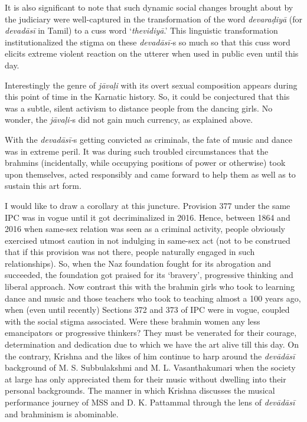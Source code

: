 {It is also significant to note that such dynamic social changes brought about by the judiciary were well-captured in the transformation of the word \textit{devaraḍiyā} (for \textit{devadāsī} in Tamil) to a cuss word ‘\textit{thevidiyā}.’ This linguistic transformation institutionalized the stigma on these \textit{devadāsī-}s so much so that this cuss word elicits extreme violent reaction on the utterer when used in public even until this day.

Interestingly the genre of \textit{jāvaḷi} with its overt sexual composition appears during this point of time in the Karnatic history. So, it could be conjectured that this was a subtle, silent activism to distance people from the dancing girls. No wonder, the \textit{jāvaḷi-}s did not gain much currency, as explained above.

With the \textit{devadāsī-}s getting convicted as criminals, the fate of music and dance was in extreme peril. It was during such troubled circumstances that the brahmins (incidentally, while occupying positions of power or otherwise) took upon themselves, acted responsibly and came forward to help them as well as to sustain this art form.

I would like to draw a corollary at this juncture. Provision 377 under the same IPC was in vogue until it got decriminalized in 2016. Hence, between 1864 and 2016 when same-sex relation was seen as a criminal activity, people obviously exercised utmost caution in not indulging in same-sex act (not to be construed that if this provision was not there, people naturally engaged in such relationships). So, when the Naz foundation fought for its abrogation and succeeded, the foundation got praised for its ‘bravery’, progressive thinking and liberal approach. Now contrast this with the brahmin girls who took to learning dance and music and those teachers who took to teaching almost a 100 years ago, when (even until recently) Sections 372 and 373 of IPC were in vogue, coupled with the social stigma associated. Were these brahmin women any less emancipators or progressive thinkers? They must be venerated for their courage, determination and dedication due to which we have the art alive till this day. On the contrary, Krishna and the likes of him continue to harp around the \textit{devādāsī} background of M. S. Subbulakshmi and M. L. Vasanthakumari when the society at large has only appreciated them for their music without dwelling into their personal backgrounds. The manner in which Krishna discusses the musical performance journey of MSS and D. K. Pattammal through the lens of \textit{devādāsī }and brahminism is abominable.

}
